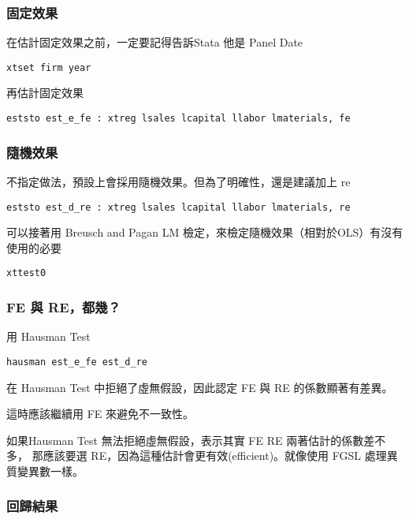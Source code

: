 \begin{frame}[fragile]
    \frametitle{固定效果}

    在估計固定效果之前，一定要記得告訴Stata 他是 Panel Date

    \begin{lstlisting}
xtset firm year \end{lstlisting}
    \vfill
    再估計固定效果 
\begin{lstlisting}
eststo est_e_fe : xtreg lsales lcapital llabor lmaterials, fe \end{lstlisting}

\end{frame}

\begin{frame}[fragile]
    \frametitle{隨機效果}
    不指定做法，預設上會採用隨機效果。但為了明確性，還是建議加上 re
\begin{lstlisting}
eststo est_d_re : xtreg lsales lcapital llabor lmaterials, re \end{lstlisting}

    \vfill
    可以接著用 Breusch and Pagan LM 檢定，來檢定隨機效果（相對於OLS）有沒有使用的必要
\begin{lstlisting}
xttest0 \end{lstlisting}  

\end{frame}

\begin{frame}[fragile]
    \frametitle{FE 與 RE，都幾？}

    用 Hausman Test
    \begin{lstlisting}
hausman est_e_fe est_d_re \end{lstlisting}  
    
    \vfill

    在 Hausman Test 中拒絕了虛無假設，因此認定 FE 與 RE 的係數顯著有差異。

    這時應該繼續用 FE 來避免不一致性。
    \vfill

    如果Hausman Test 無法拒絕虛無假設，表示其實 FE RE 兩著估計的係數差不多，
    那應該要選 RE，因為這種估計會更有效(efficient)。就像使用 FGSL 處理異質變異數一樣。

\end{frame}

\begin{frame}
    \frametitle{回歸結果}

    \begin{table}
        
    \end{table}

\end{frame}

